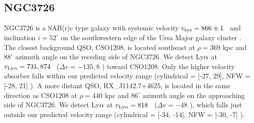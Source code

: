 






\subsection{NGC3726}
NGC3726 is a SAB(r)c type galaxy with systemic velocity $v_{\rm sys}= 866 \pm 1$ \kms~and inclination $i = 52^{\circ}$ on the southwestern edge of the Ursa Major galaxy cluster \citep{verheijen2001}. The closest background QSO, CSO1208, is located southeast at $\rho = 369$ kpc and $88^{\circ}$ azimuth angle on the receding side of NGC3726. We detect Ly$\rm \alpha$ at $v_{\rm Ly\alpha} = 731, 874$ \kms~($\Delta v = -135, 8$ \kms) toward CSO1208. Only the higher velocity absorber falls within our predicted velocity range (cylindrical = [-27, 29], NFW = [-28, 21] \kms). A more distant QSO, RX\_J1142.7+4625, is located in the same direction as CSO1208 at $\rho = 440$ kpc and $86^{\circ}$ azimuth angle on the approaching side of NGC3726. We detect Ly$\rm \alpha$ at $v_{\rm Ly\alpha} = 818$ \kms~($\Delta v = -48$ \kms), which falls just outside our predicted velocity range (cylindrical = [-34, -14], NFW = [-30, -7] \kms). 

